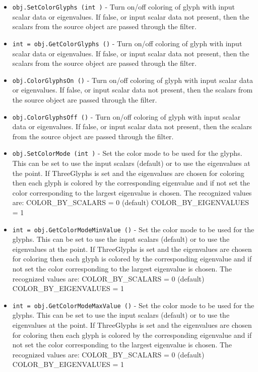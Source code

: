 \begin{itemize}
\item  \verb|obj.SetColorGlyphs (int )| -  Turn on/off coloring of glyph with input scalar data or
 eigenvalues. If false, or input scalar data not present, then the
 scalars from the source object are passed through the filter.

\item  \verb|int = obj.GetColorGlyphs ()| -  Turn on/off coloring of glyph with input scalar data or
 eigenvalues. If false, or input scalar data not present, then the
 scalars from the source object are passed through the filter.

\item  \verb|obj.ColorGlyphsOn ()| -  Turn on/off coloring of glyph with input scalar data or
 eigenvalues. If false, or input scalar data not present, then the
 scalars from the source object are passed through the filter.

\item  \verb|obj.ColorGlyphsOff ()| -  Turn on/off coloring of glyph with input scalar data or
 eigenvalues. If false, or input scalar data not present, then the
 scalars from the source object are passed through the filter.

\item  \verb|obj.SetColorMode (int )| -  Set the color mode to be used for the glyphs.  This can be set to
 use the input scalars (default) or to use the eigenvalues at the
 point.  If ThreeGlyphs is set and the eigenvalues are chosen for
 coloring then each glyph is colored by the corresponding
 eigenvalue and if not set the color corresponding to the largest
 eigenvalue is chosen.  The recognized values are:
 COLOR\_BY\_SCALARS = 0 (default)
 COLOR\_BY\_EIGENVALUES = 1

\item  \verb|int = obj.GetColorModeMinValue ()| -  Set the color mode to be used for the glyphs.  This can be set to
 use the input scalars (default) or to use the eigenvalues at the
 point.  If ThreeGlyphs is set and the eigenvalues are chosen for
 coloring then each glyph is colored by the corresponding
 eigenvalue and if not set the color corresponding to the largest
 eigenvalue is chosen.  The recognized values are:
 COLOR\_BY\_SCALARS = 0 (default)
 COLOR\_BY\_EIGENVALUES = 1

\item  \verb|int = obj.GetColorModeMaxValue ()| -  Set the color mode to be used for the glyphs.  This can be set to
 use the input scalars (default) or to use the eigenvalues at the
 point.  If ThreeGlyphs is set and the eigenvalues are chosen for
 coloring then each glyph is colored by the corresponding
 eigenvalue and if not set the color corresponding to the largest
 eigenvalue is chosen.  The recognized values are:
 COLOR\_BY\_SCALARS = 0 (default)
 COLOR\_BY\_EIGENVALUES = 1


\end{itemize}
